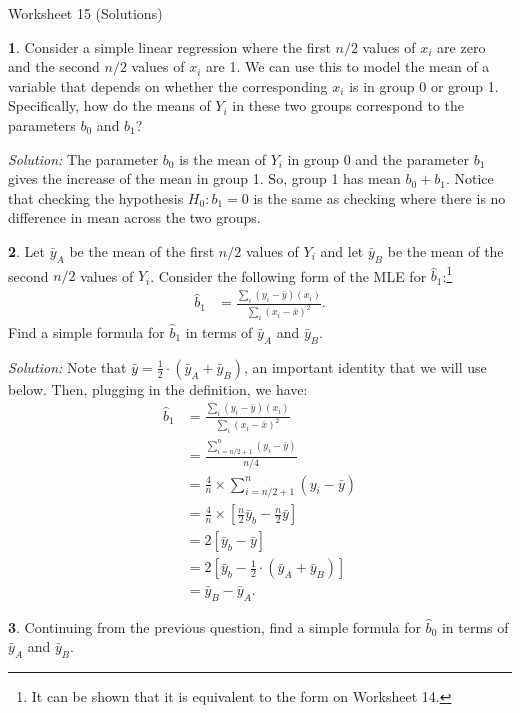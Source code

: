 \documentclass{tufte-handout}
\begin{document}
\justify

{\LARGE Worksheet 15 (Solutions)}

\vspace*{18pt}


\textbf{1}. Consider a simple linear regression where the first $n/2$ values of $x_i$ are 
zero and the second $n/2$ values of $x_i$ are 1. We can use this to model the
mean of a variable that depends on whether the corresponding $x_i$ is in group
0 or group 1. Specifically, how do the means of $Y_i$ in these two groups
correspond to the parameters $b_0$ and $b_1$?

\textit{Solution:} The parameter $b_0$ is the mean of $Y_i$ in group 0 and the parameter $b_1$ gives
the increase of the mean in group 1. So, group 1 has mean $b_0 + b_1$. Notice that
checking the hypothesis $H_0: b_1 = 0$ is the same as checking where there is no
difference in mean across the two groups.

\textbf{2}. Let $\bar{y}_A$ be the mean of the first $n/2$ values of $Y_i$ and let $\bar{y}_B$
be the mean of the second $n/2$ values of $Y_i$. Consider the following form of the
MLE for $\widehat{b}_1$:\footnote{
  It can be shown that it is equivalent to the form on Worksheet 14.
}
\begin{align*}
\widehat{b}_1 &= \frac{\sum_i (y_i - \bar{y}) (x_i)}{\sum_i (x_i - \bar{x})^2}.
\end{align*}
Find a simple formula for $\widehat{b}_1$ in terms of $\bar{y}_A$ and $\bar{y}_B$.

\textit{Solution:} Note that $\bar{y} = \frac{1}{2} \cdot (\bar{y}_A + \bar{y}_B)$, an important
identity that we will use below. Then, plugging in the definition, we have:
\begin{align*}
\widehat{b}_1 &= \frac{\sum_i (y_i - \bar{y}) (x_i)}{\sum_i (x_i - \bar{x})^2} \\
&= \frac{\sum_{i=n/2+1}^{n} (y_i - \bar{y})}{n/4} \\
&= \frac{4}{n} \times \sum_{i=n/2+1}^{n} (y_i - \bar{y}) \\
&= \frac{4}{n} \times \left[ \frac{n}{2} \bar{y}_b - \frac{n}{2} \bar{y} \right] \\
&= 2 \left[ \bar{y}_b - \bar{y} \right] \\
&= 2 \left[ \bar{y}_b - \frac{1}{2} \cdot (\bar{y}_A + \bar{y}_B) \right] \\
&= \bar{y}_B - \bar{y}_A.
\end{align*}

\textbf{3}. Continuing from the previous question, find a simple formula for $\widehat{b}_0$
in terms of $\bar{y}_A$ and $\bar{y}_B$.
\end{document}
